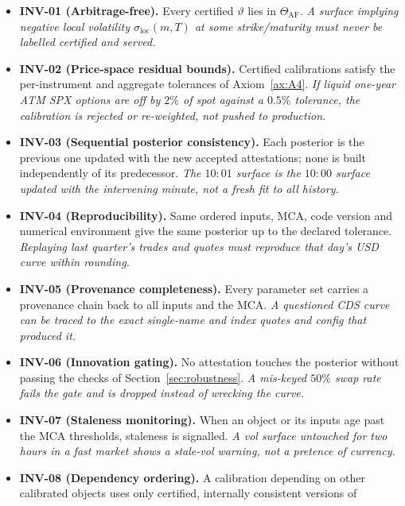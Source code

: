 \documentclass[11pt]{book}
\theoremstyle{plain}
\theoremstyle{definition}
\theoremstyle{remark}
\newcommand{\mln}{m}                             %
\newcommand{\sloc}{\sigma_{\mathrm{loc}}}        %
\newcommand{\parvec}{\vartheta}                  %
\begin{document}
\begin{itemize}[itemsep=3pt]
    \item \textbf{INV-01 (Arbitrage-free).} Every certified $\parvec$ lies in
        $\Theta_{\mathrm{AF}}$. \textit{A surface implying negative local
        volatility $\sloc(\mln,T)$ at some strike/maturity must never be labelled
        certified and served.}
    \item \textbf{INV-02 (Price-space residual bounds).} Certified calibrations
        satisfy the per-instrument and aggregate tolerances of
        Axiom~\ref{ax:A4}. \textit{If liquid one-year ATM SPX options are off by
        $2\%$ of spot against a $0.5\%$ tolerance, the calibration is rejected or
        re-weighted, not pushed to production.}
    \item \textbf{INV-03 (Sequential posterior consistency).} Each posterior is
        the previous one updated with the new accepted attestations; none is built
        independently of its predecessor. \textit{The $10{:}01$ surface is the
        $10{:}00$ surface updated with the intervening minute, not a fresh fit to
        all history.}
    \item \textbf{INV-04 (Reproducibility).} Same ordered inputs, MCA, code
        version and numerical environment give the same posterior up to the
        declared tolerance. \textit{Replaying last quarter's trades and quotes
        must reproduce that day's USD curve within rounding.}
    \item \textbf{INV-05 (Provenance completeness).} Every parameter set carries a
        provenance chain back to all inputs and the MCA. \textit{A questioned CDS
        curve can be traced to the exact single-name and index quotes and config
        that produced it.}
    \item \textbf{INV-06 (Innovation gating).} No attestation touches the
        posterior without passing the checks of Section~\ref{sec:robustness}.
        \textit{A mis-keyed $50\%$ swap rate fails the gate and is dropped instead
        of wrecking the curve.}
    \item \textbf{INV-07 (Staleness monitoring).} When an object or its inputs age
        past the MCA thresholds, staleness is signalled. \textit{A vol surface
        untouched for two hours in a fast market shows a stale-vol warning, not a
        pretence of currency.}
    \item \textbf{INV-08 (Dependency ordering).} A calibration depending on other
        calibrated objects uses only certified, internally consistent versions of

\end{itemize}
\end{document}
